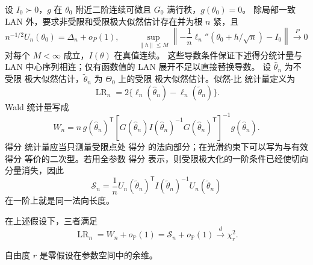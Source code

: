\begin{theorem}

\label{thm:math-testing-lan-equivalence}
设 $I_0\succ0$，$g$ 在 $\theta_0$ 附近二阶连续可微且 $G_0$ 满行秩，$g(\theta_0)=0$。
除局部一致 LAN 外，要求非受限和受限极大似然估计存在并为根 $n$ 紧，且
\[
 n^{-1/2}U_n(\theta_0)=\Delta_n+o_P(1),\qquad
 \sup_{\|h\|\le M}\left\| -\frac1n\ell_n''(\theta_0+h/\sqrt n)-I_0\right\|\xrightarrow{P}0
\]
对每个 $M<\infty$ 成立，$I(\theta)$ 在真值连续。
这些导数条件保证下述得分统计量与 LAN 中心序列相连；仅有函数值的 LAN 展开不足以直接替换导数。
设 $\widehat\theta_n$ 为不受限 极大似然估计，$\widetilde\theta_n$ 为 $\Theta_0$ 上的受限 极大似然估计。似然-比 统计量定义为
\[
 \operatorname{LR}_n
 =2\{\ell_n(\widehat\theta_n)-\ell_n(\widetilde\theta_n)\}.
\]
Wald 统计量写成
\[
 W_n
 =n\,g(\widehat\theta_n)^{\mathsf T}
 \left[
 G(\widehat\theta_n)
 I(\widehat\theta_n)^{-1}
 G(\widehat\theta_n)^{\mathsf T}
 \right]^{-1}
 g(\widehat\theta_n).
\]
得分 统计量应当只测量受限点处 得分 的法向部分；在光滑约束下可以写为与有效 得分 等价的二次型。若用全参数 得分 表示，则受限极大化的一阶条件已经使切向分量消失，因此
\[
 \mathcal S_n
 =\frac1nU_n(\widetilde\theta_n)^{\mathsf T}
 I(\widetilde\theta_n)^{-1}
 U_n(\widetilde\theta_n)
\]
在一阶上就是同一法向长度。

在上述假设下，三者满足
\begin{equation}\label{eq:math-stat-lr-wald-score-equivalence}
 \operatorname{LR}_n=W_n+o_{\mathbb P}(1)
 =\mathcal S_n+o_{\mathbb P}(1)
 \xrightarrow{d}\chi^2_r.
\end{equation}

自由度 $r$ 是零假设在参数空间中的余维。
\end{theorem}
